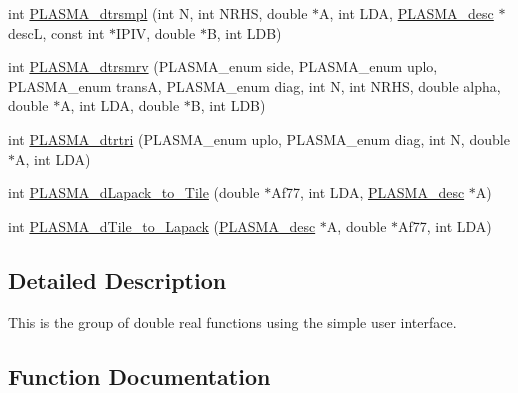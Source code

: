 \begin{DoxyCompactItemize}
\item 
int \hyperlink{group__double_ga1ee42a61d4bf0294ed216add96e6ff37_ga1ee42a61d4bf0294ed216add96e6ff37}{P\+L\+A\+S\+M\+A\+\_\+dtrsmpl} (int N, int N\+R\+H\+S, double $\ast$A, int L\+D\+A, \hyperlink{structplasma__desc__t}{P\+L\+A\+S\+M\+A\+\_\+desc} $\ast$desc\+L, const int $\ast$I\+P\+I\+V, double $\ast$B, int L\+D\+B)
\item 
int \hyperlink{group__double_ga01879443f745172ea8165d4882136d36_ga01879443f745172ea8165d4882136d36}{P\+L\+A\+S\+M\+A\+\_\+dtrsmrv} (P\+L\+A\+S\+M\+A\+\_\+enum side, P\+L\+A\+S\+M\+A\+\_\+enum uplo, P\+L\+A\+S\+M\+A\+\_\+enum trans\+A, P\+L\+A\+S\+M\+A\+\_\+enum diag, int N, int N\+R\+H\+S, double alpha, double $\ast$A, int L\+D\+A, double $\ast$B, int L\+D\+B)
\item 
int \hyperlink{group__double_ga3968f78f69610b681ab7d6c411f92796_ga3968f78f69610b681ab7d6c411f92796}{P\+L\+A\+S\+M\+A\+\_\+dtrtri} (P\+L\+A\+S\+M\+A\+\_\+enum uplo, P\+L\+A\+S\+M\+A\+\_\+enum diag, int N, double $\ast$A, int L\+D\+A)
\item 
int \hyperlink{group__double_ga36e9254b8f24778e1aed6bcee1165450_ga36e9254b8f24778e1aed6bcee1165450}{P\+L\+A\+S\+M\+A\+\_\+d\+Lapack\+\_\+to\+\_\+\+Tile} (double $\ast$Af77, int L\+D\+A, \hyperlink{structplasma__desc__t}{P\+L\+A\+S\+M\+A\+\_\+desc} $\ast$A)
\item 
int \hyperlink{group__double_ga1a9152c4ac00de6cafe8a5a4ad6718df_ga1a9152c4ac00de6cafe8a5a4ad6718df}{P\+L\+A\+S\+M\+A\+\_\+d\+Tile\+\_\+to\+\_\+\+Lapack} (\hyperlink{structplasma__desc__t}{P\+L\+A\+S\+M\+A\+\_\+desc} $\ast$A, double $\ast$Af77, int L\+D\+A)
\end{DoxyCompactItemize}


\subsection{Detailed Description}
This is the group of double real functions using the simple user interface. 

\subsection{Function Documentation}
\hypertarget{group__double_gaf337216ce367c98b6e78e15f05ca928b_gaf337216ce367c98b6e78e15f05ca928b}{}
